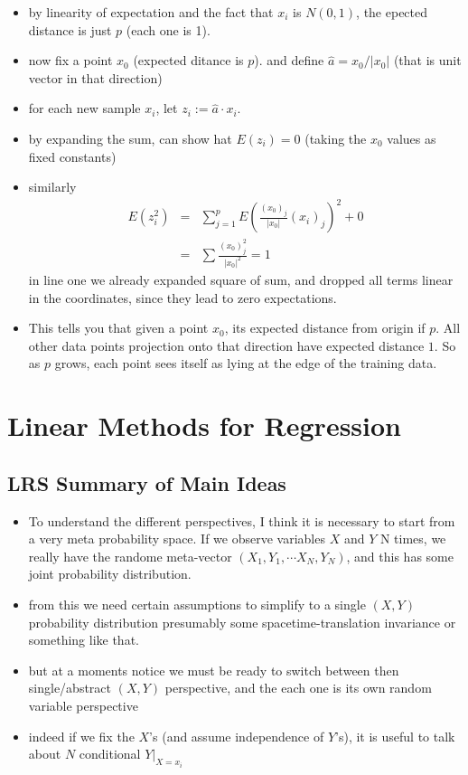 \documentclass[a4paper]{report}
\newcommand{\<}{\textless}
\renewcommand{\>}{\textgreater}
\begin{document}
\begin{itemize}
\begin{itemize}
      \item by linearity of expectation and the fact that $x_i$ is $N(0,1)$, the epected distance is just $p$ (each one is 1).
      \item now fix a point $x_0$ (expected ditance is $p$). and define $\hat{a} = x_0/|x_0|$ (that is unit vector in that direction)
      \item for each new sample $x_i$, let $z_i:= \hat{a} \cdot x_i$.
      \item by expanding the sum, can show hat $E(z_i) = 0$ (taking the $x_0$ values as fixed constants)
      \item similarly
	\begin{eqnarray}
	  E(z_i^2) &=&\sum_{j=1}^p E\left( \frac{(x_0)_j}{|x_0|} (x_i)_j\right)^2 + 0 \\
	   &=& \sum\frac{(x_0)_j^2}{|x_0|^2} = 1
	\end{eqnarray}
	in line one we already expanded square of sum, and dropped all terms linear in the coordinates, since they lead to zero expectations.
      \item This tells you that given a point $x_0$, its expected distance from origin if $p$. All other data points projection onto that direction have expected distance $1$. So as $p$ grows, each point sees itself as lying at the edge of the training data. 
    \end{itemize}
\end{itemize}


\chapter{Linear Methods for Regression}
\setcounter{section}{-1}
\section{LRS Summary of Main Ideas}
\begin{itemize}
  \item To understand the different perspectives, I think it is necessary to start from a very meta probability space. If we observe variables $X$ and $Y$ N times, we really have the randome meta-vector $(X_1, Y_1, \cdots X_N, Y_N)$, and this has some joint probability distribution.
  \item from this we need certain assumptions to simplify to a single $(X,Y)$ probability distribution
    \subitem presumably some spacetime-translation invariance or something like that.
  \item but at a moments notice we must be ready to switch between then single/abstract $(X,Y)$ perspective, and the each one is its own random variable perspective
  \item indeed if we fix the $X$'s (and assume independence of $Y$'s), it is useful to talk about $N$ conditional $Y|_{X=x_i}$
\end{itemize}
\end{document}
